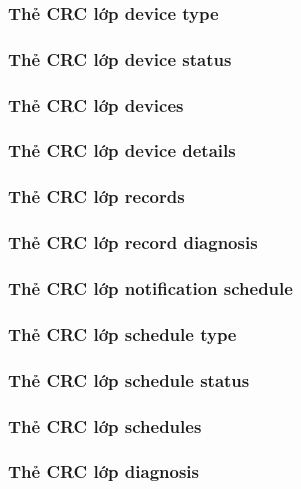 \subsubsection{Thẻ CRC lớp device type}

\subsubsection{Thẻ CRC lớp device status}

\subsubsection{Thẻ CRC lớp devices}

\subsubsection{Thẻ CRC lớp device details}
\subsubsection{Thẻ CRC lớp records}

\subsubsection{Thẻ CRC lớp record diagnosis}

\subsubsection{Thẻ CRC lớp notification schedule}

\subsubsection{Thẻ CRC lớp schedule type}

\subsubsection{Thẻ CRC lớp schedule status}

\subsubsection{Thẻ CRC lớp schedules}

\subsubsection{Thẻ CRC lớp diagnosis}

